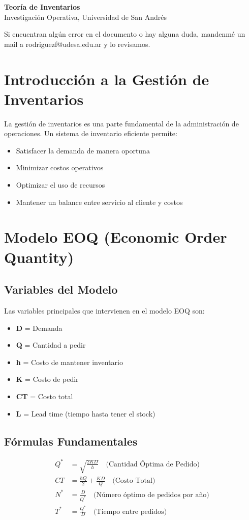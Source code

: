 \documentclass[11pt,a4paper]{article}
\begin{document}
\begin{center}
    {\LARGE \textbf{Teoría de Inventarios}}\\[0.5em]
    {Investigación Operativa, Universidad de San Andrés}
  \end{center}

Si encuentran algún error en el documento o hay alguna duda, mandenmé un mail a rodriguezf@udesa.edu.ar y lo revisamos.

\section{Introducción a la Gestión de Inventarios}
La gestión de inventarios es una parte fundamental de la administración de operaciones. Un sistema de inventario eficiente permite:
\begin{itemize}
    \item Satisfacer la demanda de manera oportuna
    \item Minimizar costos operativos
    \item Optimizar el uso de recursos
    \item Mantener un balance entre servicio al cliente y costos
\end{itemize}

\section{Modelo EOQ (Economic Order Quantity)}
\subsection{Variables del Modelo}
Las variables principales que intervienen en el modelo EOQ son:
\begin{itemize}
    \item \textbf{D} = Demanda
    \item \textbf{Q} = Cantidad a pedir
    \item \textbf{h} = Costo de mantener inventario
    \item \textbf{K} = Costo de pedir
    \item \textbf{CT} = Costo total
    \item \textbf{L} = Lead time (tiempo hasta tener el stock)
\end{itemize}

\subsection{Fórmulas Fundamentales}
\begin{align*}
Q^* &= \sqrt{\frac{2KD}{h}} \quad \text{(Cantidad Óptima de Pedido)} \\
CT &= \frac{hQ}{2} + \frac{KD}{Q} \quad \text{(Costo Total)} \\
N^* &= \frac{D}{Q^*} \quad \text{(Número óptimo de pedidos por año)} \\
T^* &= \frac{Q^*}{D} \quad \text{(Tiempo entre pedidos)}
\end{align*}
\end{document}
